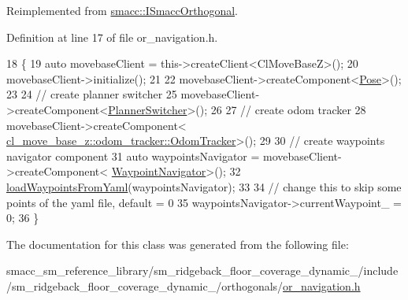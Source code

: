 Reimplemented from \hyperlink{classsmacc_1_1ISmaccOrthogonal_a6bb31c620cb64dd7b8417f8705c79c7a}{smacc\+::\+I\+Smacc\+Orthogonal}.



Definition at line 17 of file or\+\_\+navigation.\+h.


\begin{DoxyCode}
18     \{
19         \textcolor{keyword}{auto} movebaseClient = this->createClient<ClMoveBaseZ>();
20         movebaseClient->initialize();
21 
22         movebaseClient->createComponent<\hyperlink{classcl__move__base__z_1_1Pose}{Pose}>();
23 
24         \textcolor{comment}{// create planner switcher}
25         movebaseClient->createComponent<\hyperlink{classcl__move__base__z_1_1PlannerSwitcher}{PlannerSwitcher}>();
26 
27         \textcolor{comment}{// create odom tracker}
28         movebaseClient->createComponent<
      \hyperlink{classcl__move__base__z_1_1odom__tracker_1_1OdomTracker}{cl\_move\_base\_z::odom\_tracker::OdomTracker}>();
29 
30         \textcolor{comment}{// create waypoints navigator component}
31         \textcolor{keyword}{auto} waypointsNavigator = movebaseClient->createComponent<
      \hyperlink{classcl__move__base__z_1_1WaypointNavigator}{WaypointNavigator}>();
32         \hyperlink{classsm__ridgeback__floor__coverage__dynamic__1_1_1OrNavigation_a4aa48f8ae2e850900e06ea10b472d6cf}{loadWaypointsFromYaml}(waypointsNavigator);
33 
34         \textcolor{comment}{// change this to skip some points of the yaml file, default = 0}
35         waypointsNavigator->currentWaypoint\_ = 0;
36     \}
\end{DoxyCode}


The documentation for this class was generated from the following file\+:\begin{DoxyCompactItemize}
\item 
smacc\+\_\+sm\+\_\+reference\+\_\+library/sm\+\_\+ridgeback\+\_\+floor\+\_\+coverage\+\_\+dynamic\+\_/include/sm\+\_\+ridgeback\+\_\+floor\+\_\+coverage\+\_\+dynamic\+\_/orthogonals/\hyperlink{sm__ridgeback__floor__coverage__dynamic__1_2include_2sm__ridgeback__floor__coverage__dynamic__1_2orthogonals_2or__navigation_8h}{or\+\_\+navigation.\+h}\end{DoxyCompactItemize}

